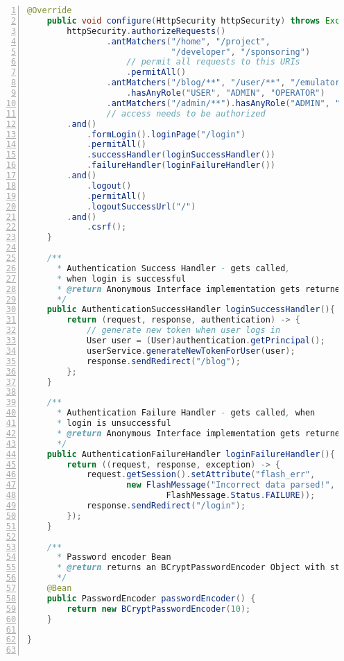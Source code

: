 \documentclass[paper=a4,12pt]{scrreprt}
\begin{document}
\begin{lstlisting}[caption={Spring Security - Konfiguration}, captionpos=b, label={listing:spring_sec_config}, language=java, numbers=left,
  stepnumber=1]
    @Override
    public void configure(HttpSecurity httpSecurity) throws Exception {
        httpSecurity.authorizeRequests()
                .antMatchers("/home", "/project", 
                             "/developer", "/sponsoring")
                    // permit all requests to this URIs
                    .permitAll()
                .antMatchers("/blog/**", "/user/**", "/emulator3D")
                    .hasAnyRole("USER", "ADMIN", "OPERATOR")
                .antMatchers("/admin/**").hasAnyRole("ADMIN", "OPERATOR")
                // access needs to be authorized
        .and()
            .formLogin().loginPage("/login")
            .permitAll()
            .successHandler(loginSuccessHandler())
            .failureHandler(loginFailureHandler())
        .and()
            .logout()
            .permitAll()
            .logoutSuccessUrl("/")
        .and()
            .csrf();
    }

    /**
      * Authentication Success Handler - gets called, 
      * when login is successful
      * @return Anonymous Interface implementation gets returned
      */
    public AuthenticationSuccessHandler loginSuccessHandler(){
        return (request, response, authentication) -> {
            // generate new token when user logs in
            User user = (User)authentication.getPrincipal();
            userService.generateNewTokenForUser(user);
            response.sendRedirect("/blog");
        };
    }

    /**
      * Authentication Failure Handler - gets called, when 
      * login is unsuccessful
      * @return Anonymous Interface implementation gets returned
      */
    public AuthenticationFailureHandler loginFailureHandler(){
        return ((request, response, exception) -> {
            request.getSession().setAttribute("flash_err",
                    new FlashMessage("Incorrect data parsed!",
                            FlashMessage.Status.FAILURE));
            response.sendRedirect("/login");
        });
    }

    /**
      * Password encoder Bean
      * @return returns an BCryptPasswordEncoder Object with strength 10
      */
    @Bean
    public PasswordEncoder passwordEncoder() {
        return new BCryptPasswordEncoder(10);
    }

}
  
\end{lstlisting}

\pagebreak
\end{document}
